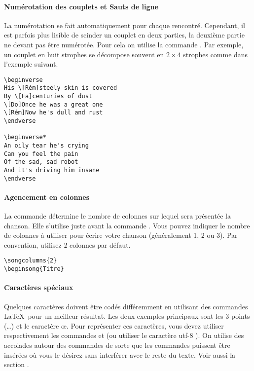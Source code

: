 \documentclass[online]{patacrep}
\begin{document}
\paragraph{Numérotation des couplets et Sauts de ligne}
La numérotation se fait automatiquement pour chaque
 rencontré. Cependant, il est parfois plus
lisible de scinder un couplet en deux parties, la deuxième partie ne
devant pas être numérotée. Pour cela on utilise la commande
. Par exemple, un couplet en huit strophes se
décompose souvent en $2 \times 4$ strophes comme dans l'exemple
suivant.

\begin{verbatim}
\beginverse
His \[Rém]steely skin is covered
By \[Fa]centuries of dust
\[Do]Once he was a great one
\[Rém]Now he's dull and rust
\endverse

\beginverse*
An oily tear he's crying
Can you feel the pain
Of the sad, sad robot
And it's driving him insane
\endverse
\end{verbatim}

\paragraph{Agencement en colonnes}
La commande  détermine le nombre de colonnes sur
lequel sera présentée la chanson. Elle s'utilise juste avant la
commande . Vous pouvez indiquer le nombre de
colonnes à utiliser pour écrire votre chanson (généralement 1, 2 ou
3). Par convention, utilisez 2 colonnes par défaut.

\begin{verbatim}
\songcolumns{2}
\beginsong{Titre}
\end{verbatim}

\paragraph{Caractères spéciaux}
Quelques caractères doivent être codés différemment en utilisant des
commandes \LaTeX\, pour un meilleur résultat. Les deux exemples
principaux sont les 3 points (\dots) et le caractère \oe{}. Pour
représenter ces caractères, vous devez utiliser respectivement les
commandes  et  (ou utiliser le
caractère utf-8 ). On utilise des accolades autour des
commandes de sorte que les commandes puissent être insérées où vous le
désirez sans interférer avec le reste du texte. Voir aussi la section
.
\end{document}
